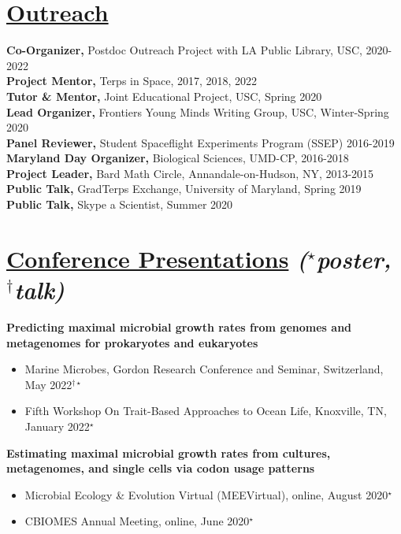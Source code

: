 \documentclass[]{res}
\begin{document}
\begin{resume}
\section{\underline{Outreach}}\vspace{2mm}
{\bf Co-Organizer,} Postdoc Outreach Project with LA Public Library, USC, 2020-2022\\
{\bf Project Mentor,} Terps in Space, 2017, 2018, 2022\\
{\bf Tutor \& Mentor,} Joint Educational Project, USC, Spring 2020\\
{\bf Lead Organizer,} Frontiers Young Minds Writing Group, USC, Winter-Spring 2020\\
{\bf Panel Reviewer,} Student Spaceflight Experiments Program (SSEP) 2016-2019\\
{\bf Maryland Day Organizer,} Biological Sciences, UMD-CP, 2016-2018\\
{\bf Project Leader,} Bard Math Circle, Annandale-on-Hudson, NY, 2013-2015 \\
{\bf Public Talk,} GradTerps Exchange, University of Maryland, Spring 2019\\
{\bf Public Talk,} Skype a Scientist, Summer 2020

 \section{\underline{Conference Presentations} \emph{{($^{\star}$poster, $^{\dagger}$talk)}}} \vspace{2mm}
 
 {\bf Predicting maximal microbial growth rates from genomes and metagenomes for prokaryotes and eukaryotes}
 \begin{itemize}
 \item Marine Microbes, Gordon Research Conference and Seminar, Switzerland, May 2022$^{\dagger\star}$
 \item Fifth Workshop On Trait-Based Approaches to Ocean Life, Knoxville, TN, January 2022$^{\star}$
 \end{itemize} 
 
 {\bf Estimating maximal microbial growth rates from cultures, metagenomes, and single cells via codon usage patterns}
 \begin{itemize}
 \item Microbial Ecology \& Evolution Virtual (MEEVirtual), online, August 2020$^{\star}$
 \item CBIOMES Annual Meeting, online, June 2020$^{\star}$
 \end{itemize}
 

\end{resume}
\end{document}
